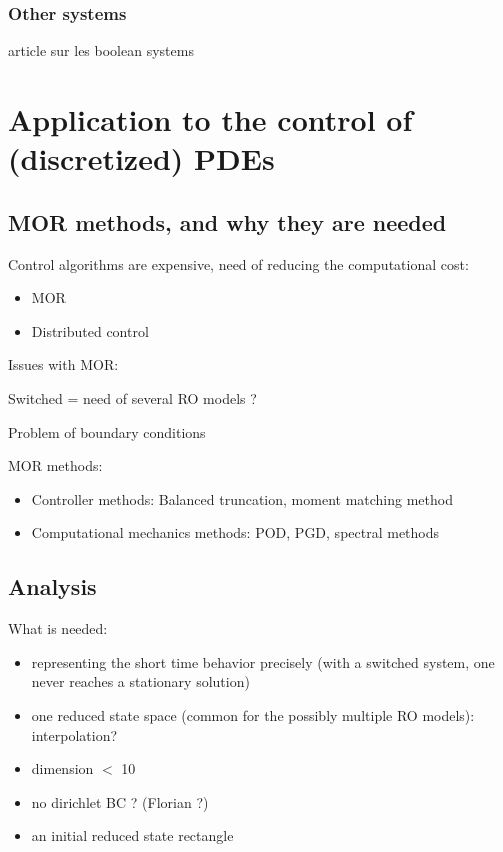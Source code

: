 \documentclass[a4paper,10pt]{article}
\begin{document}
\subsubsection{Other systems}

article sur les boolean systems


\section{Application to the control of (discretized) PDEs}
\subsection{MOR methods, and why they are needed}

Control algorithms are expensive, need of reducing the computational cost:
\begin{itemize}
 \item MOR 
 \item Distributed control
\end{itemize}


Issues with MOR:

Switched = need of several RO models ?

Problem of boundary conditions 

MOR methods: 
\begin{itemize}
 \item Controller methods: Balanced truncation, moment matching method
 \item Computational mechanics methods: POD, PGD, spectral methods
\end{itemize}




\subsection{Analysis}

What is needed: 
\begin{itemize}
 \item representing the short time behavior precisely (with a switched system, one never
reaches a stationary solution)
  \item one reduced state space (common for the possibly multiple RO models): interpolation? 
  \item dimension $<$ 10
  \item no dirichlet BC ? (Florian ?)
  \item an initial reduced state rectangle
\end{itemize}
\end{document}

